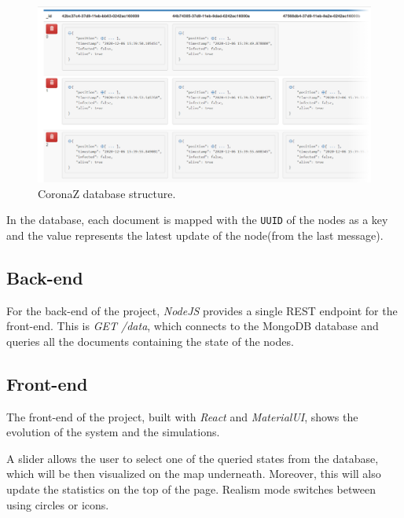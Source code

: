 \documentclass[conference]{IEEEtran}
\begin{document}
		\begin{figure}[htbp]
			\centerline{\includegraphics[width=\linewidth]{img/database.png}}
			\caption{CoronaZ database structure.}
			\label{fig:database}
		\end{figure}
	
		In the database, each document is mapped with the \texttt{UUID} of the nodes as a key and the value represents the latest update of the node(from the last message).
	
	\subsection{Back-end}
	
		For the back-end of the project, \textit{NodeJS} provides a single REST endpoint for the front-end. 
		This is \textit{GET /data}, which connects to the MongoDB database and queries all the documents containing the state of the nodes.
	
	\subsection{Front-end}

		The front-end of the project, built with \textit{React} and \textit{MaterialUI}, shows the evolution of the system and the simulations.
		
		A slider allows the user to select one of the queried states from the database, which will be then visualized on the map underneath. 
		Moreover, this will also update the statistics on the top of the page.
		Realism mode switches between using circles or icons.
		
\end{document}
